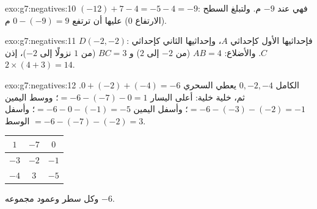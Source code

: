 \begin{solution}{exo:g7:negatives:10}
$(-12) + 7 - 4 = -5 - 4 = -9$: فهي عند $-9$ م. ولتبلغ السطح
(الارتفاع $0$) عليها أن ترتفع $0 - (-9) = 9$ م.
\end{solution}

\begin{solution}{exo:g7:negatives:11}
$D(-2, -2)$: فإحداثيها الأول كإحداثي $A$، وإحداثيها الثاني كإحداثي
$C$. والأضلاع: $AB = 4$ (من $-2$ إلى $2$) و $BC = 3$ (من $1$ نزولًا إلى
$-2$)، إذن  $2 \times (4 + 3) = 14$.
\end{solution}

\begin{solution}{exo:g7:negatives:12}
 الكامل $0, -2, -4$ يعطي  السحري
$0 + (-2) + (-4) = -6$. ثم، خلية خلية:
أعلى اليسار $= -6 - (-7) - 0 = 1$؛ ووسط اليمين $= -6 - (-3) - (-2) =
-1$؛ وأسفل اليمين $= -6 - 0 - (-1) = -5$؛ وأسفل الوسط
$= -6 - (-7) - (-2) = 3$.
\begin{center}
\renewcommand{\arraystretch}{1.4}
\begin{tabular}{|c|c|c|}
\hline
$1$ & $-7$ & $0$ \\
\hline
$-3$ & $-2$ & $-1$ \\
\hline
$-4$ & $3$ & $-5$ \\
\hline
\end{tabular}
\end{center}
وكل سطر وعمود  مجموعه $-6$.
\end{solution}

